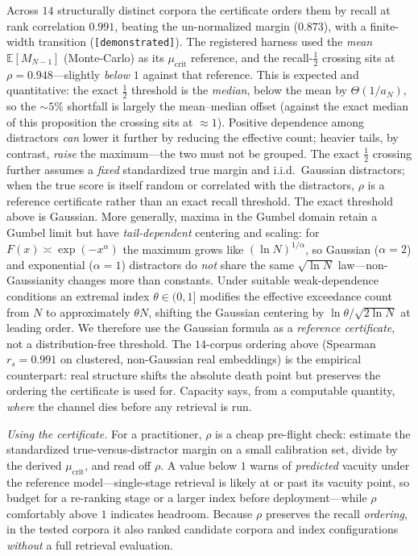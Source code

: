\documentclass[11pt]{article}
\theoremstyle{definition}
\theoremstyle{remark}
\newcommand{\E}{\mathbb{E}}
\begin{document}
Across $14$ structurally distinct corpora the certificate orders them by recall at
rank correlation $0.991$, beating the un-normalized margin ($0.873$), with a
finite-width transition (\texttt{[demonstrated]}). The registered harness used the
\emph{mean} $\E[M_{N-1}]$ (Monte-Carlo) as its $\mu_{\mathrm{crit}}$ reference, and
the recall-$\tfrac12$ crossing sits at $\rho=0.948$---slightly \emph{below} $1$
against that reference. This is expected and quantitative: the exact $\tfrac12$
threshold is the \emph{median}, below the mean by $\Theta(1/a_N)$, so the $\sim\!5\%$
shortfall is largely the mean--median offset (against the exact median of this
proposition the crossing sits at $\approx1$). Positive dependence among distractors
\emph{can} lower it further by reducing the effective count; heavier tails, by
contrast, \emph{raise} the maximum---the two must not be grouped. The exact
$\tfrac12$ crossing further assumes a \emph{fixed} standardized true margin and
i.i.d.\ Gaussian distractors; when the true score is itself random or correlated with
the distractors, $\rho$ is a reference certificate rather than an exact recall
threshold. The exact threshold above is Gaussian. More generally, maxima in the Gumbel domain
retain a Gumbel limit but have \emph{tail-dependent} centering and scaling: for
$F(x)\asymp\exp(-x^\alpha)$ the maximum grows like $(\ln N)^{1/\alpha}$, so Gaussian
($\alpha{=}2$) and exponential ($\alpha{=}1$) distractors do \emph{not} share the same
$\sqrt{\ln N}$ law---non-Gaussianity changes more than constants. Under suitable
weak-dependence conditions an extremal index $\theta\in(0,1]$ modifies the effective
exceedance count from $N$ to approximately $\theta N$, shifting the Gaussian centering
by $\ln\theta/\sqrt{2\ln N}$ at leading order. We therefore use the Gaussian formula as
a \emph{reference certificate}, not a distribution-free threshold. The $14$-corpus
ordering above (Spearman $r_s=0.991$ on clustered,
non-Gaussian real embeddings) is the empirical counterpart: real structure shifts the
absolute death point but preserves the ordering the certificate is used for.
Capacity says, from a computable quantity, \emph{where} the channel dies
before any retrieval is run.

\emph{Using the certificate.} For a practitioner, $\rho$ is a cheap pre-flight check:
estimate the standardized true-versus-distractor margin on a small calibration set,
divide by the derived $\mu_{\mathrm{crit}}$, and read off $\rho$. A value below $1$
warns of \emph{predicted} vacuity under the reference model---single-stage retrieval is
likely at or past its vacuity point, so budget for a re-ranking stage or a larger index
before deployment---while $\rho$ comfortably above $1$ indicates headroom. Because
$\rho$ preserves the recall \emph{ordering}, in the tested corpora it also ranked
candidate corpora and index configurations \emph{without} a full retrieval evaluation.
\end{document}
